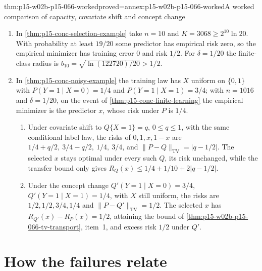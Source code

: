 \begin{hbtheorem}{thm:p15-w02b-p15-066-worked}{proved=annex:p15-w02b-p15-066-worked}{A worked comparison of capacity, covariate shift and concept change}
\begin{enumerate}
\item In \cref{thm:p15-conc-selection-example} take \(n=10\) and
      \(K=3068\geq2^{10}\ln20\). With probability at least \(19/20\)
      some predictor has empirical risk zero, so the empirical minimizer
      has training error \(0\) and risk \(1/2\). For \(\delta=1/20\) the
      finite-class radius is \(b_{10}=\sqrt{\ln(122720)/20}>1/2\).
\item In \cref{thm:p15-conc-noisy-example} the training law has
      \(X\) uniform on \(\{0,1\}\) with
      \(P(Y=1\mid X=0)=1/4\) and \(P(Y=1\mid X=1)=3/4\); with
      \(n=1016\) and \(\delta=1/20\), on the event of
      \cref{thm:p15-conc-finite-learning} the empirical minimizer is the
      predictor \(x\), whose risk under \(P\) is \(1/4\).
      \begin{enumerate}
      \item Under covariate shift to \(Q\{X=1\}=q\), \(0\leq q\leq1\),
            with the same conditional label law, the risks of
            \(0,1,x,1-x\) are \(1/4+q/2,\ 3/4-q/2,\ 1/4,\ 3/4\), and
            \(\|P-Q\|_{\mathrm{TV}}=|q-1/2|\). The selected \(x\) stays
            optimal under every such \(Q\), its risk unchanged, while
            the transfer bound only gives
            \(R_Q(x)\leq1/4+1/10+2|q-1/2|\).
      \item Under the concept change \(Q'(Y=1\mid X=0)=3/4\),
            \(Q'(Y=1\mid X=1)=1/4\), with \(X\) still uniform, the risks
            are \(1/2,1/2,3/4,1/4\) and \(\|P-Q'\|_{\mathrm{TV}}=1/2\).
            The selected \(x\) has \(R_{Q'}(x)-R_P(x)=1/2\), attaining
            the bound of \cref{thm:p15-w02b-p15-066-tv-transport},
            item~1, and excess risk \(1/2\) under \(Q'\).
      \end{enumerate}
\end{enumerate}
\end{hbtheorem}

\section{How the failures relate}
\label{sec:p15-w02b-p15-066-relations}

